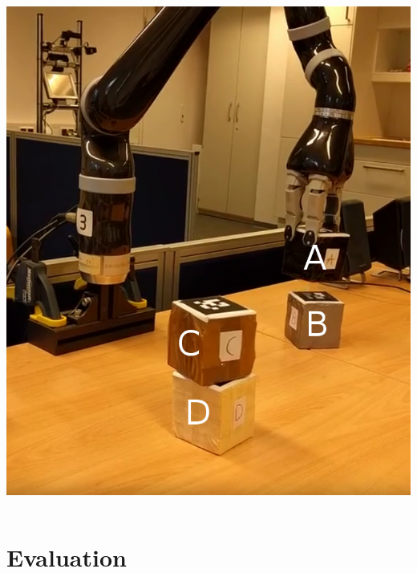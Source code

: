 \begin{frame}
\begin{columns}
\begin{column}{0.4\textwidth}
    \includegraphics[width=\textwidth]{../thesis/img/blocks-world-annotated}
    \end{column}
  \end{columns}
\end{frame}


\section{Evaluation}

